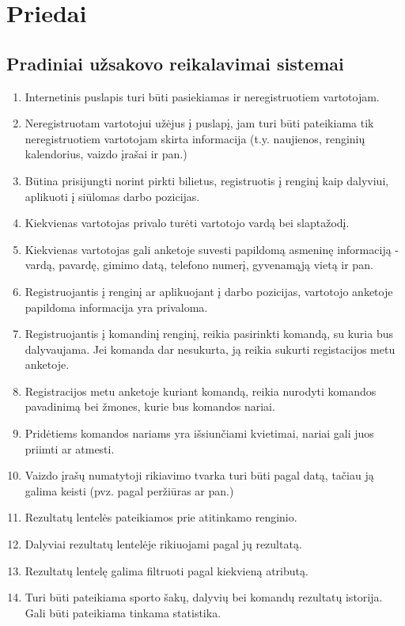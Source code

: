 \documentclass{VUMIFPSkursinis}
\begin{document}
    \section{Priedai}\label{priedai}
        \subsection{Pradiniai užsakovo reikalavimai sistemai} \label{priedai_uzsakovoReikalavimai}
		\begin{enumerate}
﻿ 			\item Internetinis puslapis turi būti pasiekiamas ir neregistruotiem vartotojam.
			\item Neregistruotam vartotojui užėjus į puslapį, jam turi būti pateikiama tik neregistruotiem vartotojam skirta informacija (t.y. naujienos, renginių kalendorius, vaizdo įrašai ir pan.)
			\item Būtina prisijungti norint pirkti bilietus, registruotis į renginį kaip dalyviui, aplikuoti į siūlomas darbo pozicijas.
			\item Kiekvienas vartotojas privalo turėti vartotojo vardą bei slaptažodį.
			\item Kiekvienas vartotojas gali anketoje suvesti papildomą asmeninę informaciją - vardą, pavardę, gimimo datą, telefono numerį, gyvenamąją vietą ir pan.
			\item Registruojantis į renginį ar aplikuojant į darbo pozicijas, vartotojo anketoje papildoma informacija yra privaloma.
			\item Registruojantis į komandinį renginį, reikia pasirinkti komandą, su kuria bus dalyvaujama. Jei komanda dar nesukurta, ją reikia sukurti registacijos metu anketoje.
			\item Registracijos metu anketoje kuriant komandą, reikia nurodyti komandos pavadinimą bei žmones, kurie bus komandos nariai.
			\item Pridėtiems komandos nariams yra išsiunčiami kvietimai, nariai gali juos priimti ar atmesti.
			\item Vaizdo įrašų numatytoji rikiavimo tvarka turi būti pagal datą, tačiau ją galima keisti (pvz. pagal peržiūras ar pan.)
			\item Rezultatų lentelės pateikiamos prie atitinkamo renginio.
			\item Dalyviai rezultatų lentelėje rikiuojami pagal jų rezultatą.
			\item Rezultatų lentelę galima filtruoti pagal kiekvieną atributą.
			\item Turi būti pateikiama sporto šakų, dalyvių bei komandų rezultatų istorija. Gali būti pateikiama tinkama statistika.

\end{enumerate}
\end{document}
